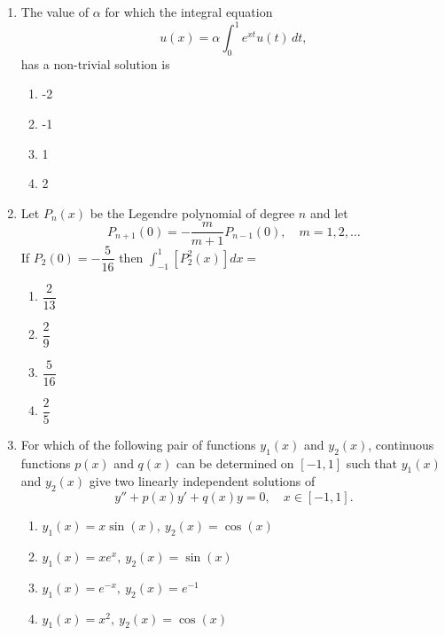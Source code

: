 \documentclass[journal]{IEEEtran}
\numberwithin{equation}{enumi}
\numberwithin{figure}{enumi}
\begin{document}
\begin{enumerate}
\item The value of $\alpha$ for which the integral equation
\[
u(x) = \alpha \int_0^1 e^{xt} u(t)\,dt,
\]
has a non-trivial solution is
\hfill{}
\begin{multicols}{4}
\begin{enumerate}
    \item -2
    \item -1
    \item 1
    \item 2
\end{enumerate}
\end{multicols}



\item Let $P_n(x)$ be the Legendre polynomial of degree $n$ and let
\[
P_{n+1}(0) = -\frac{m}{m+1} P_{n-1}(0), \quad m = 1, 2, \ldots
\]
If $P_2(0) = -\dfrac{5}{16}$ then $\int_{-1}^1 \left[P_2^2(x)\right] dx =$
\hfill{}
\begin{multicols}{4}
\begin{enumerate}
    \item $\dfrac{2}{13}$
    \item $\dfrac{2}{9}$
    \item $\dfrac{5}{16}$ 
    \item $\dfrac{2}{5}$
\end{enumerate}
\end{multicols}



\item For which of the following pair of functions $y_1(x)$ and $y_2(x)$, continuous functions $p(x)$ and $q(x)$ can be determined on $[-1, 1]$ such that $y_1(x)$ and $y_2(x)$ give two linearly independent solutions of \hfill{}
\[
y'' + p(x)y' + q(x)y = 0,\quad x \in [-1, 1].
\]
\begin{multicols}{2}
    \begin{enumerate}
        \item $y_1(x) = x \sin(x),\ y_2(x) = \cos(x)$
        \item $y_1(x) = x e^x,\ y_2(x) = \sin(x)$ 
        \item $y_1(x) = e^{-x},\ y_2(x) = e^{-1}$
        \item $y_1(x) = x^2,\ y_2(x) = \cos(x)$
    \end{enumerate}
    \end{multicols}
 




\end{enumerate}
\end{document}
